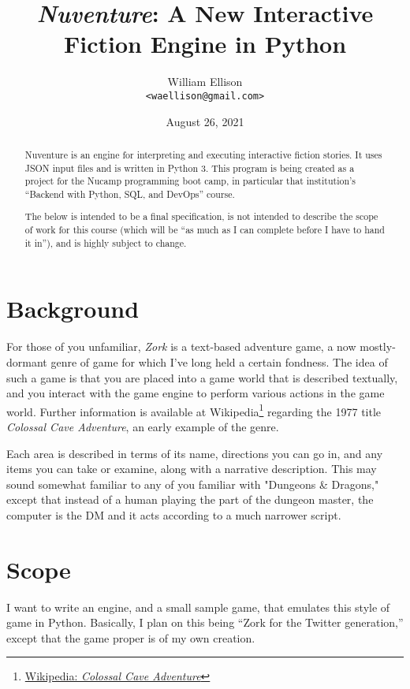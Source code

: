 \documentclass[11pt,letterpaper]{article}
\title{{\it Nuventure}: A New Interactive Fiction Engine in Python}
\author{William Ellison\\{\tt <waellison@gmail.com>}}
\date{August 26, 2021}
\begin{document}
\maketitle

\begin{abstract}
    {\sc Nuventure} is an engine for interpreting and executing interactive fiction stories.  It uses JSON input files and is written in Python 3.  This program is being created as a project for the {\sc Nucamp} programming boot camp, in particular that institution's ``Backend with Python, SQL, and DevOps'' course.

    The below is intended to be a final specification, is not intended to describe the scope of work for this course (which will be ``as much as I can complete before I have to hand it in''), and is highly subject to change.
\end{abstract}

\section{Background}

For those of you unfamiliar, {\it Zork} is a text-based adventure game, a now mostly-dormant genre of game for which I've long held a certain fondness.  The idea of such a game is that you are placed into a game world that is described textually, and you interact with the game engine to perform various actions in the game world.  Further information is available at Wikipedia\footnote{\href{https://en.wikipedia.org/wiki/Colossal_Cave_Adventure}{Wikipedia: {\it Colossal Cave Adventure}}} regarding the 1977 title {\it Colossal Cave Adventure}, an early example of the genre.

Each area is described in terms of its name, directions you can go in, and any items you can take or examine, along with a narrative description.  This may sound somewhat familiar to any of you familiar with "Dungeons \& Dragons," except that instead of a human playing the part of the dungeon master, the computer is the DM and it acts according to a much narrower script.

\section{Scope}

I want to write an engine, and a small sample game, that emulates this style of game in Python.  Basically, I plan on this being ``Zork for the Twitter generation,'' except that the game proper is of my own creation.
\end{document}
